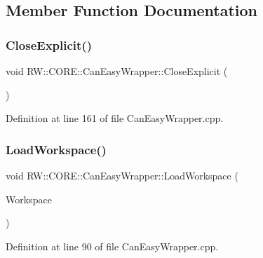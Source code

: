 \subsection{Member Function Documentation}
\hypertarget{class_r_w_1_1_c_o_r_e_1_1_can_easy_wrapper_ab70adb2dc78f160412ec155c4ead3f15}{}\label{class_r_w_1_1_c_o_r_e_1_1_can_easy_wrapper_ab70adb2dc78f160412ec155c4ead3f15} 
\subsubsection{\texorpdfstring{Close\+Explicit()}{CloseExplicit()}}
{\footnotesize\ttfamily void R\+W\+::\+C\+O\+R\+E\+::\+Can\+Easy\+Wrapper\+::\+Close\+Explicit (\begin{DoxyParamCaption}{ }\end{DoxyParamCaption})\hspace{0.3cm}{\ttfamily [private]}}



Definition at line 161 of file Can\+Easy\+Wrapper.\+cpp.

\hypertarget{class_r_w_1_1_c_o_r_e_1_1_can_easy_wrapper_aad31305e358aaaa21bfb93aeab5a3b33}{}\label{class_r_w_1_1_c_o_r_e_1_1_can_easy_wrapper_aad31305e358aaaa21bfb93aeab5a3b33} 
\subsubsection{\texorpdfstring{Load\+Workspace()}{LoadWorkspace()}}
{\footnotesize\ttfamily void R\+W\+::\+C\+O\+R\+E\+::\+Can\+Easy\+Wrapper\+::\+Load\+Workspace (\begin{DoxyParamCaption}\item[{const Q\+File \&}]{Workspace }\end{DoxyParamCaption})\hspace{0.3cm}{\ttfamily [private]}}



Definition at line 90 of file Can\+Easy\+Wrapper.\+cpp.

\hypertarget{class_r_w_1_1_c_o_r_e_1_1_can_easy_wrapper_a1de1ab208ac14badbf4b1483e7821801}{}\label{class_r_w_1_1_c_o_r_e_1_1_can_easy_wrapper_a1de1ab208ac14badbf4b1483e7821801} 
